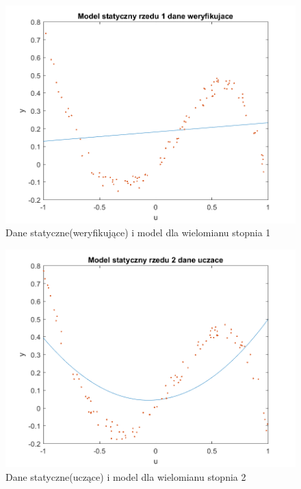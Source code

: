 \documentclass{article}
\begin{document}
\begin{figure}
\centering
\includegraphics[width=0.95\linewidth]{../dane_statyczne/dane_statyczne_model_rzedu_1_weryf}
\caption{Dane statyczne(weryfikujące) i model dla wielomianu stopnia 1}
\label{fig:danestatyczneweryf1}
\end{figure}

\begin{figure}
\centering
\includegraphics[width=0.95\linewidth]{../dane_statyczne/dane_statyczne_model_rzedu_2_uczace}
\caption{Dane statyczne(uczące) i model dla wielomianu stopnia 2}
\label{fig:danestatyczneuczace2}
\end{figure}
\end{document}
